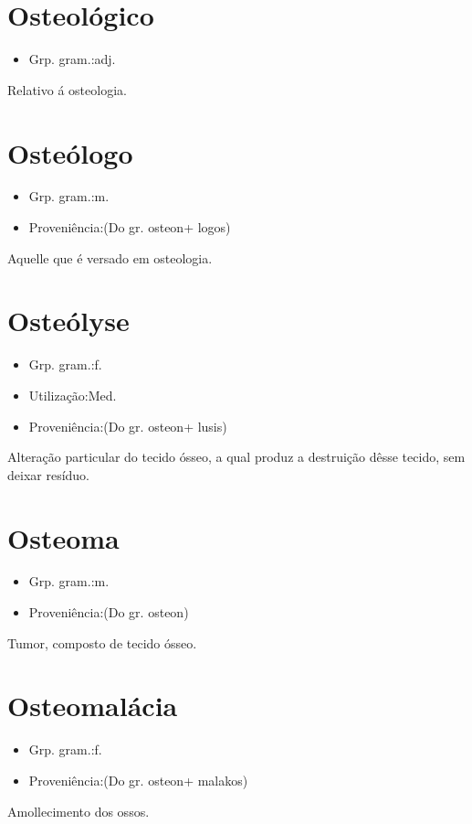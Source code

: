 \section{Osteológico}
\begin{itemize}
\item {Grp. gram.:adj.}
\end{itemize}
Relativo á osteologia.
\section{Osteólogo}
\begin{itemize}
\item {Grp. gram.:m.}
\end{itemize}
\begin{itemize}
\item {Proveniência:(Do gr. \textunderscore osteon\textunderscore  + \textunderscore logos\textunderscore )}
\end{itemize}
Aquelle que é versado em osteologia.
\section{Osteólyse}
\begin{itemize}
\item {Grp. gram.:f.}
\end{itemize}
\begin{itemize}
\item {Utilização:Med.}
\end{itemize}
\begin{itemize}
\item {Proveniência:(Do gr. \textunderscore osteon\textunderscore  + \textunderscore lusis\textunderscore )}
\end{itemize}
Alteração particular do tecido ósseo, a qual produz a destruição dêsse tecido, sem deixar resíduo.
\section{Osteoma}
\begin{itemize}
\item {Grp. gram.:m.}
\end{itemize}
\begin{itemize}
\item {Proveniência:(Do gr. \textunderscore osteon\textunderscore )}
\end{itemize}
Tumor, composto de tecido ósseo.
\section{Osteomalácia}
\begin{itemize}
\item {Grp. gram.:f.}
\end{itemize}
\begin{itemize}
\item {Proveniência:(Do gr. \textunderscore osteon\textunderscore  + \textunderscore malakos\textunderscore )}
\end{itemize}
Amollecimento dos ossos.
